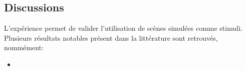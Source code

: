 \subsection{Discussions}

L'expérience permet de valider l'utilisation de scènes simulées comme stimuli. Plusieurs résultats notables présent dans la littérature sont retrouvés, nommément:

\begin{itemize}
\item {}
\end{itemize}
